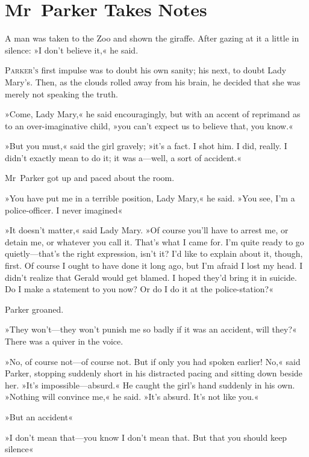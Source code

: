 

\chapter{Mr~Parker Takes Notes}

\epigraph{A man was taken to the Zoo and shown the giraffe.  After gazing at it a little in silence: »I don't believe it,« he said.}{}


\lettrine[lines=4]{P}{arker's} first impulse was to doubt his own sanity; his next, to doubt Lady Mary's. Then, as the clouds rolled away from his brain, he decided that she was merely not speaking the truth.

\zz
»Come, Lady Mary,« he said encouragingly, but with an accent of reprimand as to an over-imaginative child, »you can't expect us to believe that, you know.«

»But you must,« said the girl gravely; »it's a fact. I shot him. I did, really. I didn't exactly mean to do it; it was a—well, a sort of accident.«

Mr~Parker got up and paced about the room.

»You have put me in a terrible position, Lady Mary,« he said. »You see, I'm a police-officer. I never imagined\longdash«

»It doesn't matter,« said Lady Mary. »Of course you'll have to arrest me, or detain me, or whatever you call it. That's what I came for. I'm quite ready to go quietly—that's the right expression, isn't it? I'd like to explain about it, though, first. Of course I ought to have done it long ago, but I'm afraid I lost my head. I didn't realize that Gerald would get blamed. I hoped they'd bring it in suicide. Do I make a statement to you now? Or do I do it at the police-station?«

Parker groaned.

»They won't—they won't punish me so badly if it was an accident, will they?« There was a quiver in the voice.

»No, of course not—of course not. But if only you had spoken earlier!  No,« said Parker, stopping suddenly short in his distracted pacing and sitting down beside her. »It's impossible—absurd.« He caught the girl's hand suddenly in his own. »Nothing will convince me,« he said.  »It's absurd. It's not like you.«

»But an accident\longdash«

»I don't mean that—you know I don't mean that. But that you should keep silence\longdash«

